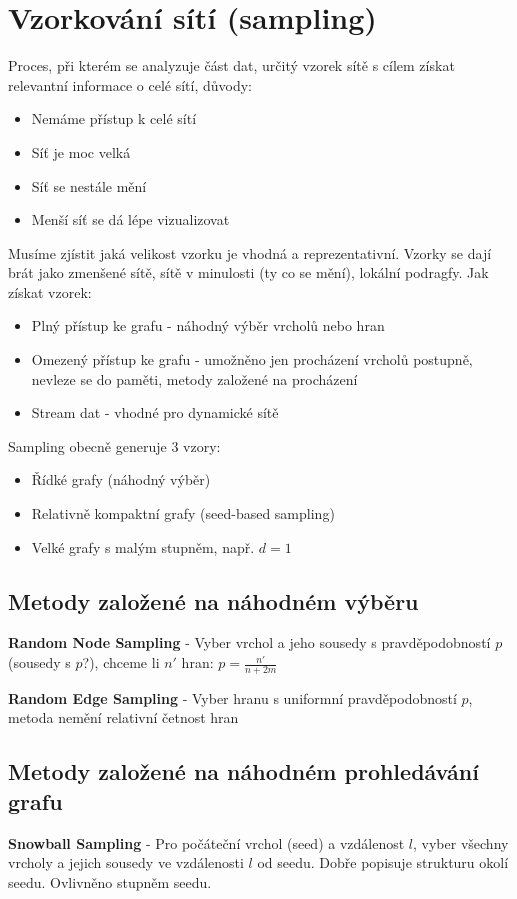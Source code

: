 \documentclass[a4paper,12pt]{article}
\begin{document}
\section{Vzorkování sítí (sampling)}
Proces, při kterém se analyzuje část dat, určitý vzorek sítě s cílem získat relevantní informace o celé sítí, důvody:
\begin{itemize}
    \item Nemáme přístup k celé sítí
    \item Síť je moc velká
    \item Síť se nestále mění
    \item Menší síť se dá lépe vizualizovat
\end{itemize}
Musíme zjístit jaká velikost vzorku je vhodná a reprezentativní. Vzorky se dají brát jako zmenšené sítě, sítě v minulosti (ty co se mění), lokální podragfy.
Jak získat vzorek:
\begin{itemize}
    \item Plný přístup ke grafu - náhodný výběr vrcholů nebo hran
    \item Omezený přístup ke grafu - umožněno jen procházení vrcholů postupně, nevleze se do paměti, metody založené na procházení
    \item Stream dat - vhodné pro dynamické sítě
\end{itemize}
Sampling obecně generuje 3 vzory:
\begin{itemize}
    \item Řídké grafy (náhodný výběr)
    \item Relativně kompaktní grafy (seed-based sampling)
    \item Velké grafy s malým stupněm, např. $d=1$
\end{itemize}
\subsection{Metody založené na náhodném výběru}

\textbf{Random Node Sampling} - Vyber vrchol a jeho sousedy s pravděpodobností $p$ (sousedy s $p$?), chceme li $n'$ hran: $p=\frac{n'}{n+2m}$

\textbf{Random Edge Sampling} - Vyber hranu s uniformní pravděpodobností $p$, metoda nemění relativní četnost hran

\subsection{Metody založené na náhodném prohledávání grafu}
\textbf{Snowball Sampling} - Pro počáteční vrchol (seed) a vzdálenost $l$, vyber všechny vrcholy a jejich sousedy ve vzdálenosti $l$ od seedu. Dobře popisuje
strukturu okolí seedu. Ovlivněno stupněm seedu.
\end{document}
